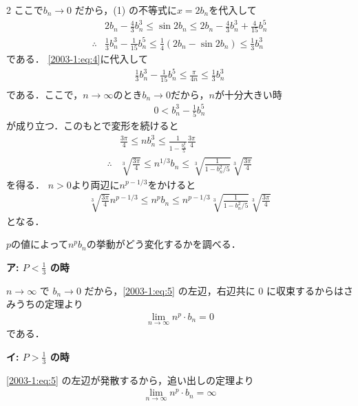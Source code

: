 \documentclass[../../../../main.tex]{subfiles}
\begin{document}
\begin{multicols}{2}
    ここで$b_n \to 0$ だから，(1) の不等式に$x=2b_n$を代入して
    \begin{align*}
         & 2b_n - \frac{4}{3}b^3_n \leq \sin 2b_n \leq 2b_n - \frac{4}{3}b^3_n + \frac{4}{15}b^5_n                   \\
        \therefore
         & \frac{1}{3}b^3_n - \frac{1}{15}b^5_n  \leq \frac{1}{4}\left(2b_n - \sin 2b_n\right) \leq \frac{1}{3}b^3_n
    \end{align*}
    である．
    \cref{2003-1:eq:4}に代入して
    \begin{align*}
        \frac{1}{3}b^3_n - \frac{1}{15}b^5_n \leq \frac{\pi}{4n}  \leq \frac{1}{3}b^3_n \\
    \end{align*}
    である．ここで，$n\to\infty$のとき$b_n\to 0$だから，$n$が十分大きい時
    \begin{align*}
        0 < b^3_n - \frac{1}{5}b^5_n
    \end{align*}
    が成り立つ．このもとで変形を続けると
    \begin{align*}
         & \frac{3\pi}{4}  \leq nb^3_n \leq \frac{1}{ 1 - \frac{b^2_n}{5}}\frac{3\pi}{4}                         \\
        \therefore
         & \sqrt[3]{\frac{3\pi}{4}} \leq n^{1/3}b_n \leq \sqrt[3]{\frac{1}{1 - b^2_n/5}}\sqrt[3]{\frac{3\pi}{4}}
    \end{align*}
    を得る．
    $n>0$より両辺に$n^{p-1/3}$をかけると
    \begin{align}
        \sqrt[3]{\frac{3\pi}{4}}n^{p-1/3} \leq n^{p}b_n \leq n^{p-1/3} \sqrt[3]{\frac{1}{1 - b^2_n/5}}\sqrt[3]{\frac{3\pi}{4}} \label{2003-1:eq:5}
    \end{align}
    となる．

    $p$の値によって$n^{p}b_n$の挙動がどう変化するかを調べる．

    \vspace{5pt}
    \textbf{ア: $P < \frac{1}{3}$ の時}

    $n \to \infty$ で $b_n \to 0$ だから，\cref{2003-1:eq:5} の左辺，右辺共に $0$ に収束するからはさみうちの定理より
    \begin{align*}
        \lim_{n\to\infty} n^p \cdot b_n = 0
    \end{align*}
    である．

    \vspace{5pt}
    \textbf{イ: $P > \frac{1}{3}$ の時}

    \cref{2003-1:eq:5} の左辺が発散するから，追い出しの定理より
    \begin{align*}
        \lim_{n\to\infty} n^p \cdot b_n = \infty
    \end{align*}


\end{multicols}
\end{document}
